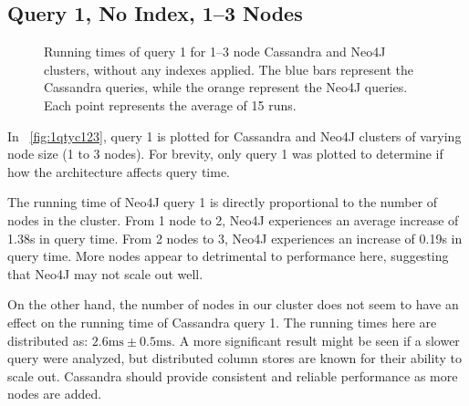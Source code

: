 \subsection{Query 1, No Index, 1--3 Nodes}\label{subsec:queries12NoIndex13Nodes}
\begin{figure}
    \caption{Running times of query 1 for 1--3 node Cassandra and Neo4J clusters, without any indexes applied.
    The blue bars represent the Cassandra queries, while the orange represent the Neo4J queries.
    Each point represents the average of 15 runs.}\label{fig:1qtyc123}
\end{figure}

In ~\autoref{fig:1qtyc123}, query 1 is plotted for Cassandra and Neo4J clusters of varying node size (1 to 3 nodes).
For brevity, only query 1 was plotted to determine if how the architecture affects query time.

The running time of Neo4J query 1 is directly proportional to the number of nodes in the cluster.
From 1 node to 2, Neo4J experiences an average increase of 1.38s in query time.
From 2 nodes to 3, Neo4J experiences an increase of 0.19s in query time.
More nodes appear to detrimental to performance here, suggesting that Neo4J may not scale out well.

On the other hand, the number of nodes in our cluster does not seem to have an effect on the running time of Cassandra
query 1.
The running times here are distributed as: $2.6\text{ms} \pm 0.5\text{ms}$.
A more significant result might be seen if a slower query were analyzed, but distributed column stores are known for
their ability to scale out.
Cassandra should provide consistent and reliable performance as more nodes are added.
